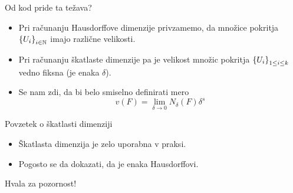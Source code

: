\documentclass[10pt]{beamer}
\begin{document}
\begin{frame}[t]{Od kod pride ta težava?}
    \begin{opomba}
        \begin{itemize}
            \item Pri računanju Hausdorffove dimenzije privzamemo, da množice pokritja \(\left\{U_i\right\}_{i \in \mathbb{N}}\) imajo različne velikosti.
            \item Pri računanju škatlaste dimenzije pa je velikost množic pokritja \(\left\{U_i\right\}_{1 \leq i \leq k}\) vedno fiksna (je enaka \(\delta\)).
            \pause
            \item Se nam zdi, da bi belo smiselno definirati mero 
            \[v(F) = \lim_{\delta \to 0} N_\delta(F) \delta^s\]
        \end{itemize}
    \end{opomba}
\end{frame}

\begin{frame}[t]{Povzetek o škatlasti dimenziji}
    \begin{itemize}
        \item Škatlasta dimenzija je zelo uporabna v praksi.
        \item Pogosto se da dokazati, da je enaka Hausdorffovi.
    \end{itemize}
\end{frame}

\begin{frame}
  \centering
  \Huge Hvala za pozornost!
\end{frame}
\end{document}

